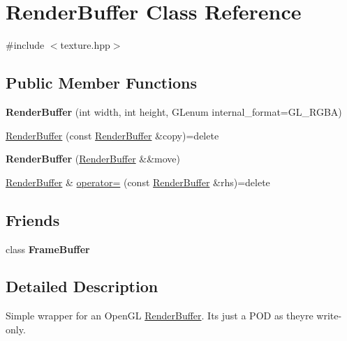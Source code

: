 \hypertarget{class_render_buffer}{}\section{Render\+Buffer Class Reference}
\label{class_render_buffer}


{\ttfamily \#include $<$texture.\+hpp$>$}

\subsection*{Public Member Functions}
\begin{DoxyCompactItemize}
\item 
\mbox{\label{class_render_buffer_ad72813870de0738efd5d20ee9b7b221c}} 
{\bfseries Render\+Buffer} (int width, int height, G\+Lenum internal\+\_\+format=G\+L\+\_\+\+R\+G\+BA)
\item 
\mbox{\hyperlink{class_render_buffer_a697b503edabdcc004635382712ea3d22}{Render\+Buffer}} (const \mbox{\hyperlink{class_render_buffer}{Render\+Buffer}} \&copy)=delete
\item 
\mbox{\label{class_render_buffer_aba3f5a8b6a083064f9e78eeb1f096d63}} 
{\bfseries Render\+Buffer} (\mbox{\hyperlink{class_render_buffer}{Render\+Buffer}} \&\&move)
\item 
\mbox{\hyperlink{class_render_buffer}{Render\+Buffer}} \& \mbox{\hyperlink{class_render_buffer_a423e4e2601fdda62d63c8fc6a0bb791c}{operator=}} (const \mbox{\hyperlink{class_render_buffer}{Render\+Buffer}} \&rhs)=delete
\end{DoxyCompactItemize}
\subsection*{Friends}
\begin{DoxyCompactItemize}
\item 
\mbox{\label{class_render_buffer_a7e815028687ed9f9e9e25851d8a17b27}} 
class {\bfseries Frame\+Buffer}
\end{DoxyCompactItemize}


\subsection{Detailed Description}
Simple wrapper for an Open\+GL \mbox{\hyperlink{class_render_buffer}{Render\+Buffer}}. It\textquotesingle{}s just a P\+OD as they\textquotesingle{}re write-\/only. 

